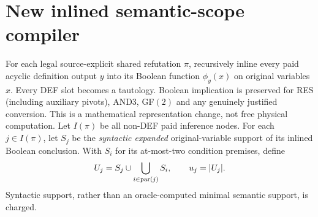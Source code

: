 \documentclass[11pt]{article}
\begin{document}
\section*{New inlined semantic-scope compiler}
For each legal source-explicit shared refutation $\pi$, recursively inline every paid acyclic definition output $y$ into its Boolean function $\phi_y(x)$ on original variables $x$. Every DEF slot becomes a tautology. Boolean implication is preserved for RES (including auxiliary pivots), AND3, GF$(2)$ and any genuinely justified conversion. This is a mathematical representation change, not free physical computation. Let $I(\pi)$ be all non-DEF paid inference nodes. For each $j\in I(\pi)$, let $S_j$ be the \emph{syntactic expanded} original-variable support of its inlined Boolean conclusion. With $S_i$ for its at-most-two condition premises, define
\[
U_j=S_j\cup\bigcup_{i\in{\rm par}(j)}S_i,\qquad u_j=|U_j|.
\]
Syntactic support, rather than an oracle-computed minimal semantic support, is charged.
\end{document}
